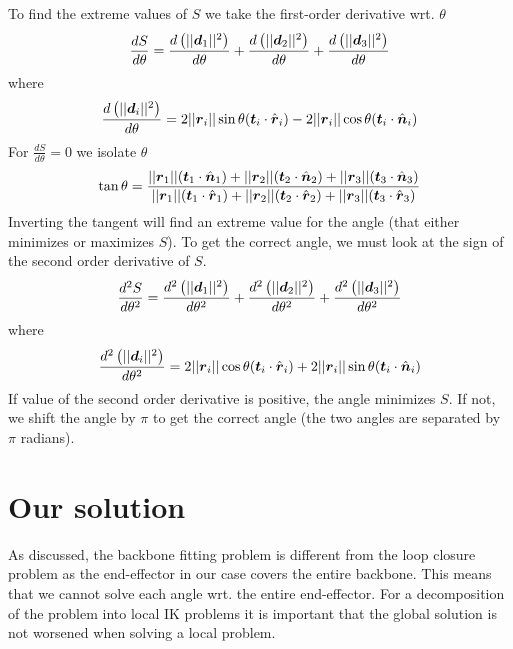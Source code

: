 To find the extreme values of $S$ we take the first-order derivative wrt. $\theta$
$$\dfrac{dS}{d\theta} = \dfrac{d\left(||\boldsymbol{d}_1||^2\right)}{d\theta} + \dfrac{d\left(||\boldsymbol{d}_2||^2\right)}{d\theta} + \dfrac{d\left(||\boldsymbol{d}_3||^2\right)}{d\theta}$$
where
$$\dfrac{d\left(||\boldsymbol{d}_i||^2\right)}{d\theta} = 2||\boldsymbol{r}_i||\sin\theta(\boldsymbol{t}_i\cdot\hat{\boldsymbol{r}}_i) - 2||\boldsymbol{r}_i||\cos\theta(\boldsymbol{t}_i\cdot\hat{\boldsymbol{n}}_i)$$
For $\frac{dS}{d\theta} = 0$ we isolate $\theta$
\begin{eqnarray*}
\tan\theta = \dfrac{||\boldsymbol{r}_1||(\boldsymbol{t}_1\cdot\hat{\boldsymbol{n}}_1) + ||\boldsymbol{r}_2||(\boldsymbol{t}_2\cdot\hat{\boldsymbol{n}}_2) + ||\boldsymbol{r}_3||(\boldsymbol{t}_3\cdot\hat{\boldsymbol{n}}_3)}{||\boldsymbol{r}_1||(\boldsymbol{t}_1\cdot\hat{\boldsymbol{r}}_1) + ||\boldsymbol{r}_2||(\boldsymbol{t}_2\cdot\hat{\boldsymbol{r}}_2) + ||\boldsymbol{r}_3||(\boldsymbol{t}_3\cdot\hat{\boldsymbol{r}}_3)}
\\
\end{eqnarray*}
Inverting the tangent will find an extreme value for the angle (that either minimizes or maximizes $S$).
To get the correct angle, we must look at the sign of the second order derivative of $S$.
\begin{eqnarray*}
\dfrac{d^2S}{d\theta^2} = \dfrac{d^2\left(||\boldsymbol{d}_1||^2\right)}{d\theta^2} + \dfrac{d^2\left(||\boldsymbol{d}_2||^2\right)}{d\theta^2} + \dfrac{d^2\left(||\boldsymbol{d}_3||^2\right)}{d\theta^2}
\end{eqnarray*}
where 
\begin{eqnarray*}
\dfrac{d^2\left(||\boldsymbol{d}_i||^2\right)}{d\theta^2} = 2||\boldsymbol{r}_i||\cos\theta(\boldsymbol{t}_i\cdot\hat{\boldsymbol{r}}_i) + 2||\boldsymbol{r}_i||\sin\theta(\boldsymbol{t}_i\cdot\hat{\boldsymbol{n}}_i)
\end{eqnarray*}
If value of the second order derivative is positive, the angle minimizes $S$. 
If not, we shift the angle by $\pi$ to get the correct angle (the two angles are separated by $\pi$ radians).



\section{Our solution}
As discussed, the backbone fitting problem is different from the loop closure problem as the end-effector in our case covers the entire backbone. 
This means that we cannot solve each angle wrt. the entire end-effector.
For a decomposition of the problem into local IK problems it is important that  the global solution is not worsened when solving a local problem.


